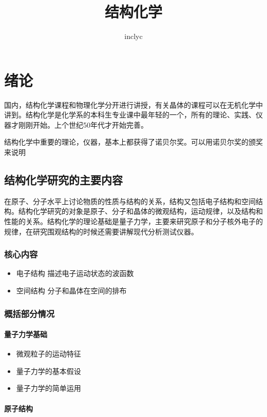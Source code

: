 \documentclass[a4paper]{ctexrep}
\title{结构化学}
\author{inclyc}
\begin{document}
    \maketitle
    
    \chapter{绪论}
    国内，结构化学课程和物理化学分开进行讲授，有关晶体的课程可以在无机化学中讲到。结构化学是化学系的本科生专业课中最年轻的一个，所有的理论、实践、仪器才刚刚开始。上个世纪50年代才开始完善。

    结构化学中重要的理论，仪器，基本上都获得了诺贝尔奖。可以用诺贝尔奖的颁奖来说明
    
    \section{结构化学研究的主要内容}
    在原子、分子水平上讨论物质的性质与结构的关系，结构又包括电子结构和空间结构。结构化学研究的对象是原子、分子和晶体的微观结构，运动规律，以及结构和性能的关系。结构化学的理论基础是量子力学，主要来研究原子和分子核外电子的规律，在研究围观结构的时候还需要讲解现代分析测试仪器。

    \subsection{核心内容}
    \begin{itemize}
        \item 电子结构 描述电子运动状态的波函数
        \item 空间结构 分子和晶体在空间的排布
    \end{itemize}

    \subsection{概括部分情况}

    \subsubsection{量子力学基础}
    \begin{itemize}
        \item 微观粒子的运动特征
        \item 量子力学的基本假设
        \item 量子力学的简单运用
    \end{itemize}
    \subsubsection{原子结构}
\end{document}
